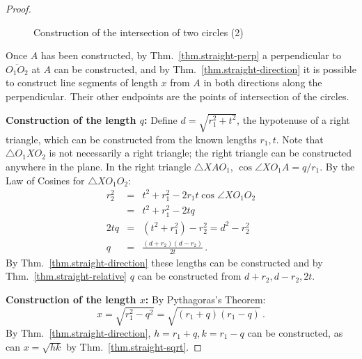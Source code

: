 \begin{proof}
\begin{figure}[b]
\begin{center}
\end{center}
\caption{Construction of the intersection of two circles (2)}\label{f.se-circle-circle2}
\end{figure}

Once $A$ has been constructed, by Thm.~\ref{thm.straight-perp} a perpendicular to $\overline{O_1O_2}$ at $A$ can be constructed, and by Thm.~\ref{thm.straight-direction} it is possible to construct line segments of length $x$ from $A$ in both directions along the perpendicular. Their other endpoints are  the points of intersection of the circles.

\noindent\textbf{Construction of the length $q$:} Define $d=\sqrt{r_1^2+t^2}$, the hypotenuse of a right triangle, which can be constructed from the known lengths $r_1,t$. Note that $\triangle O_1XO_2$ is not necessarily a right triangle; the right triangle can be constructed anywhere in the plane. In the right triangle $\triangle XAO_1$, $\cos\angle XO_1A=q/r_1$. By the Law of Cosines  for $\triangle XO_1O_2$:
\begin{eqnarray*}
r_2^2 &=& t^2 + r_1^2 - 2r_1t\cos\angle XO_1O_2\\
&=& t^2 + r_1^2 - 2tq\\
2tq &=& (t^2+r_1^2) - r_2^2=d^2-r_2^2\\
q&=&\frac{(d+r_2)(d-r_2)}{2t}\,.
\end{eqnarray*}
By Thm.~\ref{thm.straight-direction} these lengths can be constructed and by Thm.~\ref{thm.straight-relative} $q$ can be constructed from $d+r_2,d-r_2,2t$.

\medskip

\noindent\textbf{Construction of the length $x$:} By Pythagoras's Theorem:
\[
x=\sqrt{r_1^2-q^2}=\sqrt{(r_1+q)(r_1-q)}\,.
\]
By Thm.~\ref{thm.straight-direction}, $h =r_1+ q,k= r_1 - q$ can be constructed, as can $x=\sqrt{hk}$ by Thm.~\ref{thm.straight-sqrt}.
\end{proof}

